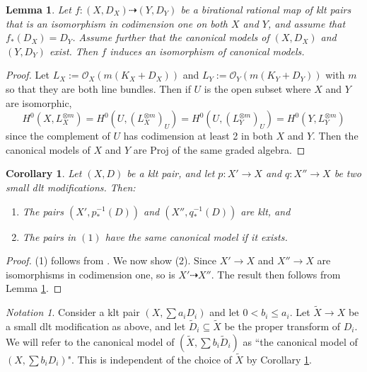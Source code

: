 \documentclass[11pt]{amsart}
\newtheorem{lemma}[theorem]{Lemma}
\newtheorem{cor}[theorem]{Corollary}
\theoremstyle{definition}
\theoremstyle{remark}
\newtheorem{notation}[theorem]{Notation}
\newcommand{\calO}{\mathcal O}
\newcommand{\tildeD}{\widetilde{D}}
\newcommand{\tildeX}{\widetilde{X}}
\begin{document}
	\begin{lemma}\label{lemma:stable:pairs:that:agree:in:codim:1:iso}
		Let $f:(X,D_X) \dashrightarrow (Y,D_Y)$ be a birational rational map of klt pairs that is an isomorphism in codimension one on both $X$ and $Y$, and assume that $f_*(D_X)=D_Y$.
		Assume further that the canonical models of $(X,D_X)$ and $(Y,D_Y)$ exist. Then $f$ induces an isomorphism of canonical models.
	\end{lemma}
	\begin{proof}Let $L_X:=\calO_X(m(K_X+D_X))$ and $L_Y:=\calO_Y(m(K_Y+D_Y))$ with $m$ so that they are both line bundles. Then if $U$ is the open subset where $X$ and $Y$ are isomorphic, $$H^0\left(X,L_X^{\otimes m}\right)=H^0\left(U,\left(L_X^{\otimes m}\right)_U\right)=H^0\left(U,\left(L_Y^{\otimes m}\right)_U\right)=H^0\left(Y,L_Y^{\otimes m}\right)$$
		since the complement of $U$ has codimension at least 2 in both $X$ and $Y$.
		Then the canonical models of $X$ and $Y$ are Proj of the same graded algebra.
	\end{proof}
	\begin{cor}\label{cor:canonical:model:does:not:depend:on:Qfactorialization}
		Let $(X,D)$ be a klt pair, and let $p:X' \to X$ and $q:X'' \to X$ be two small dlt modifications. Then:
		\begin{enumerate}
			\item The pairs $\left(X',p_*^{-1}(D)\right)$ and $\left(X'',q_*^{-1}(D)\right)$  are klt, and
			\item The pairs in $(1)$ have the same canonical model if it exists.
		\end{enumerate}
	\end{cor}
	\begin{proof} (1) follows from \cite[Lemma 2.30]{KM98}. We now show (2). Since $X' \to X$ and $X'' \to X$ are isomorphisms in codimension one, so is $X' \dashrightarrow X''$. The result then follows from Lemma \ref{lemma:stable:pairs:that:agree:in:codim:1:iso}.
	\end{proof}
	\begin{notation}\label{notation:canonical:model}
		Consider a klt pair $\left(X,\sum a_i D_i\right)$ and let $0<b_i\le a_i$. Let $\tildeX \to X$ be a small dlt modification as above, and let $\tildeD_i\subseteq \tildeX$ be the proper transform of $D_i$. We will refer to the canonical model of $\left(\tildeX,\sum b_i \tildeD_i\right)$ as ``the canonical model of $\left(X,\sum b_i D_i\right)$". This is independent of the choice of $\tildeX$ by Corollary \ref{cor:canonical:model:does:not:depend:on:Qfactorialization}. 
	\end{notation}
	
\end{document}

